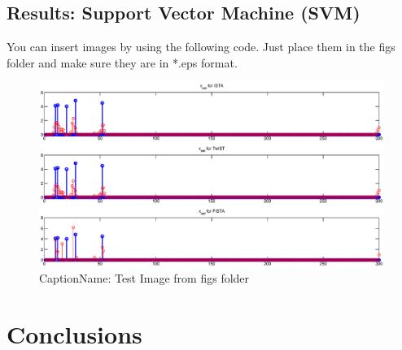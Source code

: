 \documentclass[fleqn]{article}
\begin{document}
\subsection{Results: Support Vector Machine (SVM)}
\label{sub:resultsSVM}
You can insert images by using the following code.  Just place them in the figs folder and make sure they are in *.eps format.\cite{bishop:2006}
%
\begin{figure}[H]
	{\centering
		\includegraphics[trim = 10mm 10mm 10mm 0mm, clip,width=1.0\textwidth]{figs/Test_Image}
		\caption{CaptionName: Test Image from figs folder}
		\label{fig:Test}
	}
\end{figure}

\section{Conclusions}
\label{sec:Conclusions}


 
\end{document}
